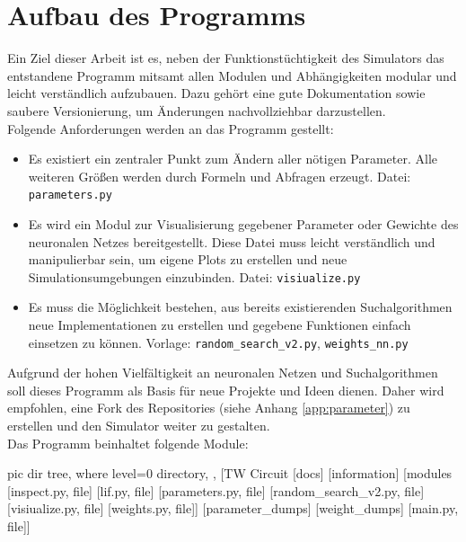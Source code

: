 \section{Aufbau des Programms}
\label{sec:imp_module}
	Ein Ziel dieser Arbeit ist es, neben der Funktionstüchtigkeit des Simulators das entstandene Programm mitsamt allen Modulen und Abhängigkeiten modular und leicht verständlich aufzubauen. Dazu gehört eine gute Dokumentation sowie saubere Versionierung, um Änderungen nachvollziehbar darzustellen.\\
	Folgende Anforderungen werden an das Programm gestellt:
	\begin{itemize}
		\item Es existiert ein zentraler Punkt zum Ändern aller nötigen Parameter. Alle weiteren Größen werden durch Formeln und Abfragen erzeugt.
		\subitem Datei: \texttt{parameters.py}
		\item Es wird ein Modul zur Visualisierung gegebener Parameter oder Gewichte des neuronalen Netzes bereitgestellt. Diese Datei muss leicht verständlich und manipulierbar sein, um eigene Plots zu erstellen und neue Simulationsumgebungen einzubinden.
		\subitem Datei: \texttt{visiualize.py}
		\item Es muss die Möglichkeit bestehen, aus bereits existierenden Suchalgorithmen neue Implementationen zu erstellen und gegebene Funktionen einfach einsetzen zu können.
		\subitem Vorlage: \texttt{random\_search\_v2.py}, \texttt{weights\_nn.py}
	\end{itemize}
	Aufgrund der hohen Vielfältigkeit an neuronalen Netzen und Suchalgorithmen soll dieses Programm als Basis für neue Projekte und Ideen dienen. Daher wird empfohlen, eine Fork des Repositories (siehe Anhang \ref{app:parameter}) zu erstellen und den Simulator weiter zu gestalten.\\
	Das Programm beinhaltet folgende Module:\\
	\begin{minipage}{0.35\textwidth}
		\vspace{0.3cm}
		\begin{forest}
			pic dir tree,
			where level=0{}{%
				directory,
			},
			[TW Circuit
				[docs]
				[information]
				[modules
					[inspect.py, file]
					[lif.py, file]
					[parameters.py, file]
					[random\_search\_v2.py, file]
					[visiualize.py, file]
					[weights.py, file]]
				[parameter\_dumps]
				[weight\_dumps]
				[main.py, file]]
		\end{forest}
	\end{minipage}
